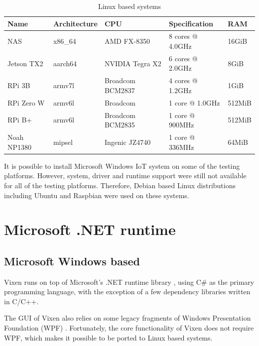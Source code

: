 \begin{table}[!h]
  \centering
  \begin{tabular}{l|l|l|l|l}
    \hline
    \textbf{Name} & \textbf{Architecture} & \textbf{CPU} & \textbf{Specification} & \textbf{RAM} \\
    \hline
    NAS         & x86\_64 & AMD FX-8350       & 8 cores @ 4.0GHz  & 16GiB   \\ \hline
    Jetson TX2  & aarch64 & NVIDIA Tegra X2   & 6 cores @ 2.0GHz  & 8GiB    \\ \hline
    RPi 3B      & armv7l  & Broadcom BCM2837  & 4 cores @ 1.2GHz  & 1GiB    \\ \hline
    RPi Zero W  & armv6l  & Broadcom          & 1 core @ 1.0GHz   & 512MiB  \\ \hline
    RPi B+      & armv6l  & Broadcom BCM2835  & 1 core @ 900MHz   & 512MiB  \\ \hline
    Noah NP1380 & mipsel  & Ingenic JZ4740    & 1 core @ 336MHz   & 64MiB   \\ \hline
  \end{tabular}
  \caption{\footnotesize Linux based systems}
  \label{tbl:linux}
\end{table}

It is possible to install Microsoft Windows IoT system on some of the testing platforms. However, system, driver and runtime support were still not available for all of the testing platforms. Therefore, Debian \cite{debian} based Linux distributions including Ubuntu \cite{ubuntu} and Raspbian \cite{raspbian} were used on these systems.

\section{Microsoft .NET runtime}

\subsection{Microsoft Windows based}

Vixen runs on top of Microsoft's .NET runtime library \cite{platt2002introducing}, using C\# \cite{hejlsberg2003c} as the primary programming language, with the exception of a few dependency libraries written in C/C++.

The GUI of Vixen also relies on some legacy fragments of Windows Presentation Foundation (WPF) \cite{wpf}. Fortunately, the core functionality of Vixen does not require WPF, which makes it possible to be ported to Linux based systems.

